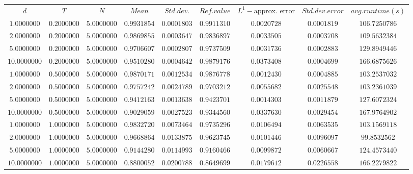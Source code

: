 \begin{tabular}{ccccccccc}
$d$ & $T$ & $N$ & $Mean$ & $Std. dev.$ & $Ref. value$ & $L^1-$approx. error & $Std. dev. error$ & $avg. runtime (s)$\\
$1.0000000$ & $0.2000000$ & $5.0000000$ & $0.9931854$ & $0.0001803$ & $0.9911310$ & $0.0020728$ & $0.0001819$ & $106.7250786$\\
$2.0000000$ & $0.2000000$ & $5.0000000$ & $0.9869855$ & $0.0003647$ & $0.9836897$ & $0.0033505$ & $0.0003708$ & $109.5632384$\\
$5.0000000$ & $0.2000000$ & $5.0000000$ & $0.9706607$ & $0.0002807$ & $0.9737509$ & $0.0031736$ & $0.0002883$ & $129.8949446$\\
$10.0000000$ & $0.2000000$ & $5.0000000$ & $0.9510280$ & $0.0004642$ & $0.9879176$ & $0.0373408$ & $0.0004699$ & $166.6875626$\\
$1.0000000$ & $0.5000000$ & $5.0000000$ & $0.9870171$ & $0.0012534$ & $0.9876778$ & $0.0012430$ & $0.0004885$ & $103.2537032$\\
$2.0000000$ & $0.5000000$ & $5.0000000$ & $0.9757242$ & $0.0024789$ & $0.9703212$ & $0.0055682$ & $0.0025548$ & $103.2361039$\\
$5.0000000$ & $0.5000000$ & $5.0000000$ & $0.9412163$ & $0.0013638$ & $0.9423701$ & $0.0014303$ & $0.0011879$ & $127.6072324$\\
$10.0000000$ & $0.5000000$ & $5.0000000$ & $0.9029059$ & $0.0027523$ & $0.9344560$ & $0.0337630$ & $0.0029454$ & $167.9764902$\\
$1.0000000$ & $1.0000000$ & $5.0000000$ & $0.9832720$ & $0.0073464$ & $0.9735296$ & $0.0106494$ & $0.0063535$ & $103.1569118$\\
$2.0000000$ & $1.0000000$ & $5.0000000$ & $0.9668864$ & $0.0133875$ & $0.9623745$ & $0.0101446$ & $0.0096097$ & $99.8532562$\\
$5.0000000$ & $1.0000000$ & $5.0000000$ & $0.9144280$ & $0.0114993$ & $0.9160466$ & $0.0099872$ & $0.0060667$ & $124.4573440$\\
$10.0000000$ & $1.0000000$ & $5.0000000$ & $0.8800052$ & $0.0200788$ & $0.8649699$ & $0.0179612$ & $0.0226558$ & $166.2279822$\\
\end{tabular}
